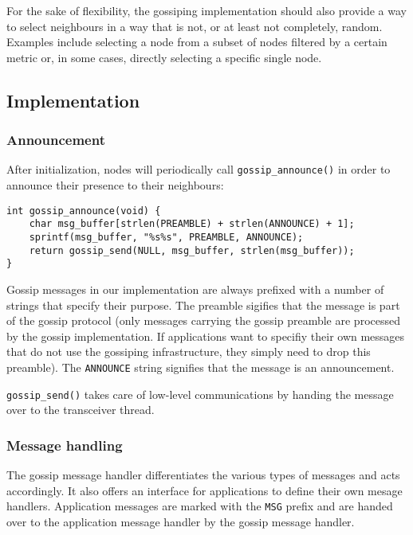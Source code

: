 \documentclass[11pt,
  a4paper,
  ngerman,
  BCOR=7mm
]{scrartcl}
\begin{document}
For the sake of flexibility, the gossiping implementation should also
provide a way to select neighbours in a way that is not, or at least not
completely, random. Examples include selecting a node from a subset of
nodes filtered by a certain metric or, in some cases, directly selecting
a specific single node.

\subsection*{Implementation}
\label{sub:implementation_gossiping}

\subsubsection*{Announcement}
\label{ssub:Announcement}
After initialization, nodes will periodically call
\lstinline!gossip_announce()! in order to announce their presence to
their neighbours:

\begin{lstlisting}
int gossip_announce(void) {
    char msg_buffer[strlen(PREAMBLE) + strlen(ANNOUNCE) + 1];
    sprintf(msg_buffer, "%s%s", PREAMBLE, ANNOUNCE);
    return gossip_send(NULL, msg_buffer, strlen(msg_buffer));
}
\end{lstlisting}

Gossip messages in our implementation are always prefixed with a number
of strings that specify their purpose. The preamble sigifies that the
message is part of the gossip protocol (only messages carrying the
gossip preamble are processed by the gossip implementation. If
applications want to specifiy their own messages that do not use the
gossiping infrastructure, they simply need to drop this preamble). The
\lstinline!ANNOUNCE! string signifies that the message is an
announcement.

\lstinline!gossip_send()! takes care of low-level communications by
handing the message over to the transceiver thread.

\subsubsection*{Message handling}
\label{ssub:Message_handling}
The gossip message handler differentiates the various types of messages
and acts accordingly. It also offers an interface for applications to
define their own mesage handlers. Application messages are marked with
the \lstinline!MSG! prefix and are handed over to the application
message handler by the gossip message handler.
\end{document}
